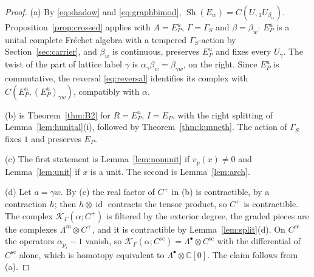 \documentclass[11pt]{amsart}
\theoremstyle{definition}
\theoremstyle{remark}
\newcommand{\C}{\mathbb C}
\newcommand{\id}{\operatorname{id}}
\newcommand{\Sh}{\operatorname{Sh}}
\begin{document}
\begin{proof}
(a)  By \eqref{eq:shadow} and \eqref{eq:graphbimod},
$\Sh(E_w)=C(U,{}_{1}U_{\beta_w})$.  Proposition~\ref{prop:crossed} applies with
$A=E_P^{u}$, $\Gamma=\Gamma_S$ and $\beta=\beta_w$: $E_P^{u}$ is a unital
complete Fr\'echet algebra with a tempered $\Gamma_S$-action by
Section~\ref{sec:carrier}, and $\beta_w$ is continuous, preserves $E_P^{u}$ and
fixes every $U_{\gamma}$.  The twist of the part of lattice label $\gamma$ is
$\alpha_{\gamma}\beta_w=\beta_{\gamma w}$, on the right.  Since $E_P^{u}$ is
commutative, the reversal \eqref{eq:reversal} identifies its complex with
$C(E_P^{u},(E_P^{u})_{\gamma w})$, compatibly with $\alpha$.

(b) is Theorem~\ref{thm:B2} for $R=E_P^{u}$, $I=E_P$, with the right splitting
of Lemma~\ref{lem:hunital}(i), followed by Theorem~\ref{thm:kunneth}.  The
action of $\Gamma_S$ fixes $1$ and preserves $E_P$.

(c)  The first statement is Lemma~\ref{lem:nonunit} if $v_p(x)\ne0$ and
Lemma~\ref{lem:unit} if $x$ is a unit.  The second is Lemma~\ref{lem:arch}.

(d)  Let $a=\gamma w$.  By (c) the real factor of $C^{+}$ in (b) is
contractible, by a contraction $h$; then $h\otimes\id$ contracts the tensor
product, so $C^{+}$ is contractible.  The complex
$\mathcal K_{\Gamma}(\alpha;C^{+})$ is filtered by the exterior degree, the
graded pieces are the complexes $\Lambda^{m}\otimes C^{+}$, and it is
contractible by Lemma~\ref{lem:split}(d).  On $C^{\mathrm{sc}}$ the operators
$\alpha_{p_i}-1$ vanish, so $\mathcal K_{\Gamma}(\alpha;C^{\mathrm{sc}})=
\Lambda^{\bullet}\otimes C^{\mathrm{sc}}$ with the differential of
$C^{\mathrm{sc}}$ alone, which is homotopy equivalent to
$\Lambda^{\bullet}\otimes\C[0]$.  The claim follows from (a).


\end{proof}
\end{document}
